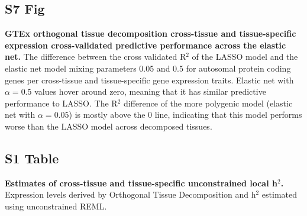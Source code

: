 \documentclass[10pt,letterpaper]{article}
\begin{document}
\subsection*{S7 Fig}
\label{S7_Fig}
{\bf GTEx orthogonal tissue decomposition cross-tissue and tissue-specific expression cross-validated predictive performance across the elastic net.} The difference between the cross validated R$^2$ of the LASSO model and the elastic net model mixing parameters 0.05 and 0.5 for autosomal protein coding genes per cross-tissue and tissue-specific gene expression traits. Elastic net with $\alpha=0.5$ values hover around zero, meaning that it has similar predictive performance to LASSO. The R$^2$ difference of the more polygenic model (elastic net with $\alpha=0.05$) is mostly above the 0 line, indicating that this model performs worse than the LASSO model across decomposed tissues.

\subsection*{S1 Table}
\label{S1_Table}
{\bf Estimates of cross-tissue and tissue-specific unconstrained local h$^2$.} Expression levels derived by Orthogonal Tissue Decomposition and h$^2$ estimated using unconstrained REML.
\end{document}
